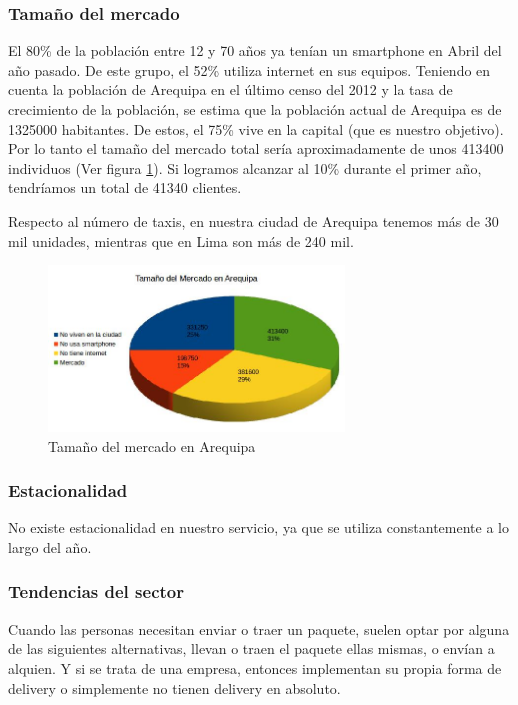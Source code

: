 \subsubsection{Tamaño del mercado}
El 80\% de la población entre 12 y 70 años ya tenían un smartphone en Abril del año pasado. De este grupo, el 52\% utiliza internet en sus equipos. Teniendo en cuenta la población de Arequipa en el último censo del 2012 y la tasa de crecimiento de la población, se estima que la población actual de Arequipa es de 1325000 habitantes. De estos, el 75\% vive en la capital (que es nuestro objetivo). Por lo tanto el tamaño del mercado total sería aproximadamente de unos 413400 individuos (Ver figura \ref{fig:mercado}). Si logramos alcanzar al 10\% durante el primer año, tendríamos un total de 41340 clientes.

Respecto al número de taxis, en nuestra ciudad de Arequipa tenemos más de 30 mil unidades, mientras que en Lima son más de 240 mil.

\begin{figure}
  \centering
   \includegraphics[width=0.7\textwidth]{img/mercado.jpg} 
  \caption{Tamaño del mercado en Arequipa}
  \label{fig:mercado}
\end{figure}


\subsubsection{Estacionalidad}
No existe estacionalidad en nuestro servicio, ya que se utiliza constantemente a lo largo del año.

\subsubsection{Tendencias del sector}
Cuando las personas necesitan enviar o traer un paquete, suelen optar por alguna de las siguientes alternativas, llevan o traen el paquete ellas mismas, o envían a alquien. Y si se trata de una empresa, entonces implementan su propia forma de delivery o simplemente no tienen delivery en absoluto.


